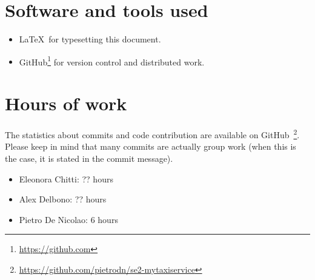 \section{Software and tools used}
\begin{itemize}
    \item \LaTeX\, for typesetting this document.
    \item GitHub\footnote{\url{https://github.com}} for version control and distributed work.
\end{itemize}

\section{Hours of work}
The statistics about commits and code contribution are available on GitHub~\footnote{\url{https://github.com/pietrodn/se2-mytaxiservice}}.
Please keep in mind that many commits are actually group work (when this is the case, it is stated in the commit message).

\begin{itemize}
    \item Eleonora Chitti: ?? hours
    \item Alex Delbono: ?? hours
    \item Pietro De Nicolao: 6 hours
\end{itemize}
